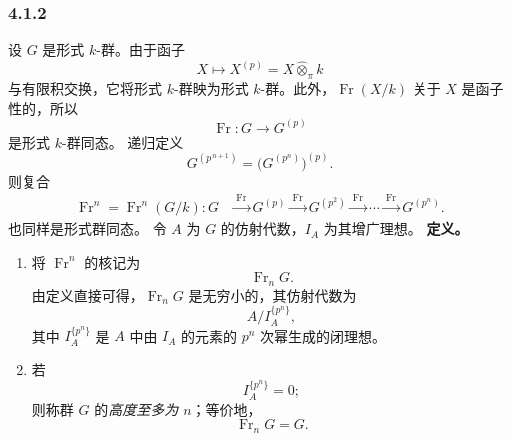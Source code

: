 
\subsubsection*{4.1.2}
\label{sga3:VIIB:4.1.2}
设 \(G\) 是形式 \(k\)-群。由于函子
\[
  X\longmapsto X^{(p)}
  =
  X\widehat\otimes_\pi k
\]
与有限积交换，它将形式 \(k\)-群映为形式 \(k\)-群。此外，\(\operatorname{Fr}(X/k)\) 关于 \(X\) 是函子性的，所以
\[
  \operatorname{Fr}:G\longrightarrow G^{(p)}
\]
是形式 \(k\)-群同态。
递归定义
\[
  G^{(p^{\,n+1})}
  =
  \bigl(G^{(p^n)}\bigr)^{(p)}.
\]
则复合
\[
\begin{aligned}
  \operatorname{Fr}^{n}
  =
  \operatorname{Fr}^{n}(G/k):
  G
  &\xrightarrow{\ \operatorname{Fr}\ }
  G^{(p)}
  \xrightarrow{\ \operatorname{Fr}\ }
  G^{(p^2)}
  \xrightarrow{\ \operatorname{Fr}\ }
  \cdots
  \xrightarrow{\ \operatorname{Fr}\ }
  G^{(p^n)}.
\end{aligned}
\]
也同样是形式群同态。
令 \(A\) 为 \(G\) 的仿射代数，\(I_A\) 为其增广理想。
\medskip
\noindent\textbf{定义。}
\begin{enumerate}
\item[\textup{(a)}] 将 \(\operatorname{Fr}^{n}\) 的核记为
\[
  \operatorname{Fr}_nG.
\]
由定义直接可得，\(\operatorname{Fr}_nG\) 是无穷小的，其仿射代数为
\[
  A/I_A^{\{p^n\}},
\]
其中 \(I_A^{\{p^n\}}\) 是 \(A\) 中由 \(I_A\) 的元素的 \(p^n\) 次幂生成的闭理想。
\item[\textup{(b)}] 若
\[
  I_A^{\{p^n\}}=0;
\]
则称群 \(G\) 的\emph{高度至多为 \(n\)}；等价地，
\[
  \operatorname{Fr}_nG=G.
\]
\end{enumerate}
